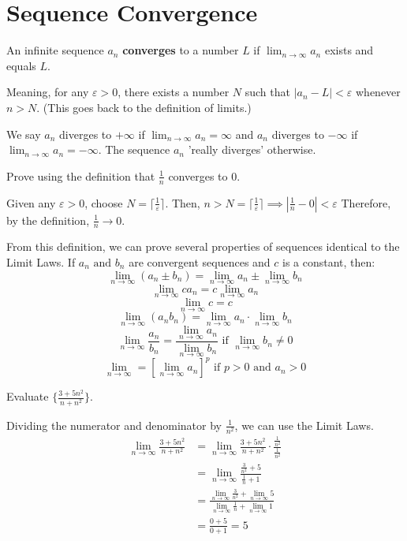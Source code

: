 \documentclass[../main.tex]{subfiles}
\begin{document}
\section{Sequence Convergence}

\begin{definition}[Convergence]
    An infinite sequence \( {a_n} \) \textbf{converges} to a number \( L \) if 
    \( \lim_{n \to \infty} a_n \) exists and equals \( L \).
\end{definition}

Meaning, for any \( \varepsilon > 0 \), there exists a number \( N \) such that \( | a_n - L | < \varepsilon \)
whenever \( n > N \). (This goes back to the definition of limits.)


We say \( a_n \) diverges to \( +\infty \) if \( \lim_{n \to \infty} a_n = \infty \)
and \( a_n \) diverges to \( -\infty \) if \( \lim_{n \to \infty} a_n = -\infty \).
The sequence \( a_n \) 'really diverges' otherwise.

\begin{example}[]
    Prove using the definition that \( \frac{1}{n} \) converges to 0.

    Given any \( \varepsilon > 0  \), choose \( N = \lceil{ \frac{1}{\varepsilon} \rceil} \).
    Then, \( n > N = \lceil{ \frac{1}{\varepsilon} \rceil} \implies | \frac{1}{n} - 0 | < \varepsilon \)
    Therefore, by the definition, \( \frac{1}{n} \rightarrow 0 \).
\end{example}

From this definition, we can prove several properties of sequences identical to the Limit Laws.
If \( {a_n} \text{ and } {b_n} \) are convergent sequences and \( c \) is a constant, then:
\[ \lim_{n \to \infty} (a_n \pm b_n) = \lim_{n \to \infty} a_n \pm \lim_{n \to \infty} b_n \]
\[ \lim_{n \to \infty} ca_n = c \lim_{n \to \infty} a_n \]
\[ \lim_{n \to \infty} c = c \]
\[ \lim_{n \to \infty} (a_n b_n) = \lim_{n \to \infty} a_n \cdot \lim_{n \to \infty} b_n \]
\[ \lim_{n \to \infty} \frac{a_n}{b_n} = \frac{\lim_{n \to \infty} a_n}{\lim_{n \to \infty} b_n}
    \text{ if } \lim_{n \to \infty} b_n \neq 0 \]
\[ \lim_{n \to \infty} =  \left[\lim_{n \to \infty} a_n \right]^p \text{ if } p>0 \text{ and } a_n>0\]

\begin{example}[]
    Evaluate \( \{ \frac{3+5n^2}{n+n^2} \} \).

    Dividing the numerator and denominator by \( \frac{1}{n^2} \), we can use the Limit Laws.
    \begin{align*}
        \lim_{n \to \infty} \frac{3+5n^2}{n+n^2} &= \lim_{n \to \infty} \frac{3+5n^2}{n+n^2} \cdot \frac{\frac{1}{n^2}}{\frac{1}{n^2}} \\
        &= \lim_{n \to \infty} \frac{\frac{3}{n^2}+5}{\frac{1}{n}+1} \\
        &= \frac{\lim_{n \to \infty} \frac{3}{n^2} + \lim_{n \to \infty} 5 }{\lim_{n \to \infty} \frac{1}{n} + \lim_{n \to \infty} 1} \\
        &= \frac{0+5}{0+1} = 5
    \end{align*}
\end{example}
\end{document}

